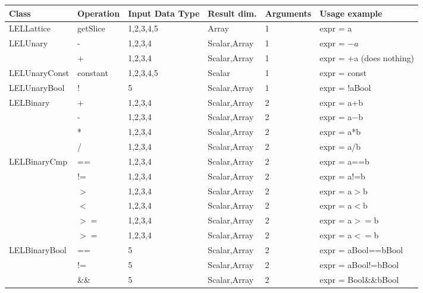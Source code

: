 \newpage
\begin{center}
\begin{tabular}{|l|l|l|l|l|l}
\hline
 Class  & Operation  & Input Data Type  & Result dim. & Arguments  & Usage example \\
\hline
LELLattice   &       getSlice   &   1,2,3,4,5  &  Array           &   1   &    expr = a \\
LELUnary     &        -         &   1,2,3,4    &  Scalar,Array    &   1   &   expr = $-a$ \\  
             &         +        &   1,2,3,4    &   Scalar,Array   &   1   &   expr = +a (does nothing) \\
LELUnaryConst &      constant   &   1,2,3,4,5  &   Scalar         &   1   &   expr = const \\ 
LELUnaryBool  &        !        &   5          &   Scalar,Array   &   1   &   expr = !aBool \\ 
LELBinary   &          +        &   1,2,3,4    &   Scalar,Array   &   2   &   expr = a+b \\   
             &         -        &   1,2,3,4    &   Scalar,Array   &   2   &   expr = a$-$b \\ 
              &        *        &   1,2,3,4    &   Scalar,Array   &   2   &   expr = a*b \\
               &       /        &   1,2,3,4    &   Scalar,Array   &   2   &   expr = a/b \\
LELBinaryCmp  &        ==       &   1,2,3,4    &   Scalar,Array   &   2   &   expr = a==b \\  
               &       !=       &   1,2,3,4    &   Scalar,Array   &   2   &   expr = a!=b \\  
                &      $>$        &   1,2,3,4    &   Scalar,Array   &   2   &   expr = a$>$b \\ 
              &        $<$        &   1,2,3,4    &   Scalar,Array   &   2   &   expr = a$<$b \\
               &       $>=$       &   1,2,3,4    &   Scalar,Array   &   2   &   expr = a$>=$b \\
                &      $>=$       &   1,2,3,4    &   Scalar,Array   &   2   &   expr = a$<=$b \\
LELBinaryBool &        ==       &   5          &   Scalar,Array   &   2   &   expr = aBool==bBool \\
               &       !=       &   5          &   Scalar,Array   &   2   &   expr = aBool!=bBool \\
                &      \&\&     &   5          &   Scalar,Array   &   2   &   expr = Bool\&\&bBool \\

\end{tabular}
\end{center}

